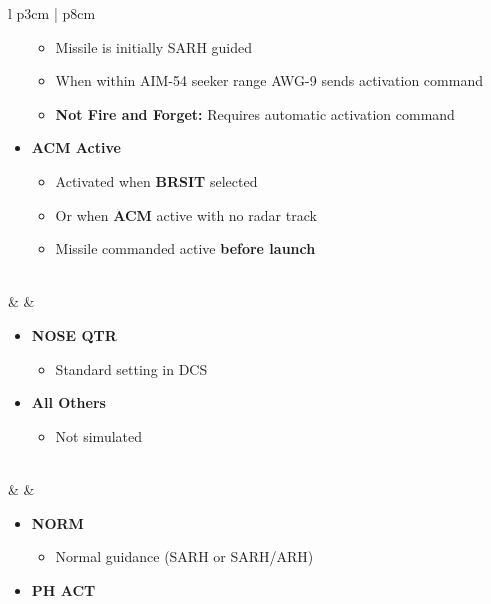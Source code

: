 \documentclass[8pt,usenames,dvipsnames,twoside]{article}
\begin{document}
\begin{center}
\begin{longtable}{l p{3cm} | p{8cm}}
\begin{minipage}[t]{\linewidth}
\begin{itemize}
\begin{itemize}
						\item Missile is initially SARH guided
						\item When within AIM-54 seeker range AWG-9 sends activation command
						\item \textbf{Not Fire and Forget:} Requires automatic activation command
					\end{itemize}
					\item \textbf{ACM Active}
					\begin{itemize}
						\item Activated when \textbf{BRSIT} selected
						\item Or when \textbf{ACM} active with no radar track
						\item Missile commanded active \textbf{before launch}
					\end{itemize}
				\end{itemize}
			\end{minipage} \\
			\midrule
			\textbullet &   &
			\begin{minipage}[t]{\linewidth}
				\vspace{-7pt}
				\begin{itemize}
					\item \textbf{NOSE QTR}
					\begin{itemize}
						\item Standard setting in DCS
					\end{itemize}
					\item \textbf{All Others}
					\begin{itemize}
						\item Not simulated
					\end{itemize}
				\end{itemize}
			\end{minipage} \\
			\midrule
			\textbullet &   &
			\begin{minipage}[t]{\linewidth}
				\vspace{-7pt}
				\begin{itemize}
					\item \textbf{NORM}
					\begin{itemize}
						\item Normal guidance (SARH or SARH/ARH)
					\end{itemize}
					\item \textbf{PH ACT}
					\begin{itemize}

\end{itemize}
\end{itemize}
\end{minipage}
\end{longtable}
\end{center}
\end{document}
